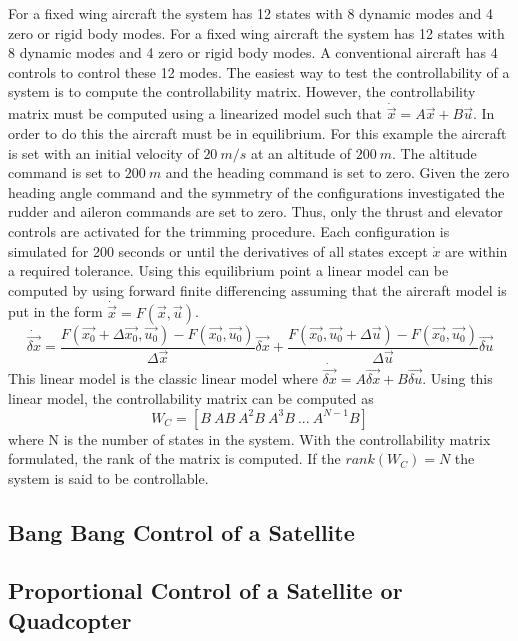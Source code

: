 For a fixed wing aircraft the system has 12 states with 8 dynamic
modes and 4 zero or rigid body modes. For a fixed wing aircraft the system has 12 states with 8 dynamic
modes and 4 zero or rigid body modes. A conventional aircraft has 4
controls to control these 12 modes. The easiest way to test the 
controllability of a system  is to compute the
controllability matrix. However, the controllability matrix must be
computed using a linearized model such that
$\dot{\vec{x}}=A\vec{x}+B\vec{u}$. In order to do this the aircraft
must be in equilibrium. For this example the aircraft is
set with an initial velocity of $20~m/s$ at an altitude of
$200~m$. The altitude command is set to $200~m$ and the heading
command is set to zero. Given the zero heading angle command and the
symmetry of the configurations investigated the rudder and aileron
commands are set to zero. Thus, only the thrust and elevator controls
are activated for the trimming procedure. Each configuration is
simulated for 200 seconds or until the derivatives of all states
except $\dot{x}$ are within a required tolerance. Using this
equilibrium point a linear model can be computed by using forward
finite differencing assuming that the
aircraft model is put in the form $\dot{\vec{x}} = F(\vec{x},\vec{u})$.
\begin{equation}
\dot{\vec{\delta x}} = \frac{F(\vec{x_0}+\Delta \vec{x_0},\vec{u_0})-F(\vec{x_0},\vec{u_0})}{\Delta
  \vec{x}}\vec{\delta x} + \frac{F(\vec{x_0},\vec{u_0}+\Delta
  \vec{u})-F(\vec{x_0},\vec{u_0})}{\Delta \vec{u}}\vec{\delta u}
\end{equation}
This linear model is the classic linear model where
$\dot{\vec{\delta x}}=A\vec{\delta{x}}+B\vec{\delta{u}}$. Using this linear model, the
controllability matrix can be computed as
\begin{equation}
W_C = [B~AB~A^2B~A^3B~...~A^{N-1}B]
\end{equation}
where N is the number of states in the system. With the controllability
matrix formulated, the rank of the matrix is computed. If the
$rank(W_C)=N$ the system is said to be controllable.

\subsection{Bang Bang Control of a Satellite}

\subsection{Proportional Control of a Satellite or Quadcopter}

